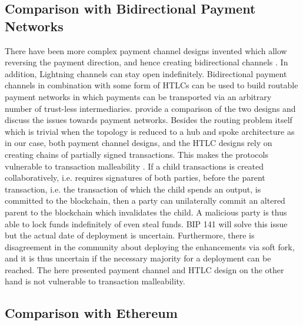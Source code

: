\subsection{Comparison with Bidirectional Payment Networks}
\label{sec:paymentnetworks}

There have been more complex payment channel designs invented which allow reversing the payment direction, and hence creating bidirectional channels \parencite{decker2015Duplex,poonbitcoin}. In addition, Lightning channels \parencite{poonbitcoin} can stay open indefinitely. Bidirectional payment channels in combination with some form of \ac{HTLC}s can be used to build routable payment networks in which payments can be transported via an arbitrary number of trust-less intermediaries. \cite{cryptoeprint:2016:408} provide a comparison of the two designs and discuss the issues towards payment networks. Besides the routing problem itself which is trivial when the topology is reduced to a hub and spoke architecture as in our case, both payment channel designs, and the \ac{HTLC} designs rely on creating chains of partially signed transactions. This makes the protocols vulnerable to transaction malleability \parencite{Andrychowicz2015}. If a child transactions is created collaboratively, i.e.  requires signatures of both parties, before the parent transaction, i.e. the transaction of which the child spends an output, is committed to the blockchain, then a party can unilaterally commit an altered parent to the blockchain which invalidates the child. A malicious party is thus able to lock funds indefinitely of even steal funds. \ac{BIP} 141 \parencite{bip141} will solve this issue but the actual date of deployment is uncertain. Furthermore, there is disagreement in the community about deploying the enhancements via soft fork, and it is thus uncertain if the necessary majority for a deployment can be reached. The here presented payment channel and \ac{HTLC} design on the other hand is not vulnerable to transaction malleability. 

\subsection{Comparison with Ethereum}

